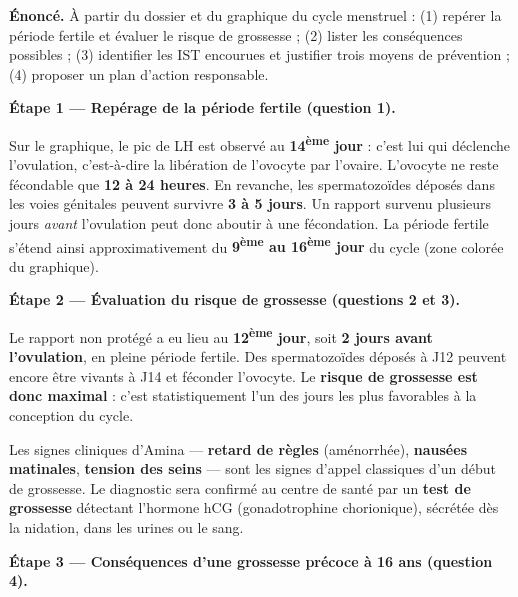\documentclass[11pt]{article}
\newcommand{\cle}[1]{{\popxbold\color{popdark}#1}}
\begin{document}
\begin{exoresolu}
\textbf{Énoncé.} À partir du dossier et du graphique du cycle menstruel : (1) repérer la période fertile et évaluer le risque de grossesse ; (2) lister les conséquences possibles ; (3) identifier les IST encourues et justifier trois moyens de prévention ; (4) proposer un plan d'action responsable.

\tcblower

\textbf{Étape 1 — Repérage de la période fertile (question 1).}

Sur le graphique, le \cle{pic de LH} est observé au \textbf{14\textsuperscript{ème} jour} : c'est lui qui déclenche l'\cle{ovulation}, c'est-à-dire la libération de l'ovocyte par l'ovaire. L'ovocyte ne reste fécondable que \textbf{12 à 24 heures}. En revanche, les spermatozoïdes déposés dans les voies génitales peuvent survivre \textbf{3 à 5 jours}. Un rapport survenu plusieurs jours \emph{avant} l'ovulation peut donc aboutir à une fécondation. La période fertile s'étend ainsi approximativement du \textbf{9\textsuperscript{ème} au 16\textsuperscript{ème} jour} du cycle (zone colorée du graphique).

\textbf{Étape 2 — Évaluation du risque de grossesse (questions 2 et 3).}

Le rapport non protégé a eu lieu au \textbf{12\textsuperscript{ème} jour}, soit \textbf{2 jours avant l'ovulation}, en pleine période fertile. Des spermatozoïdes déposés à J12 peuvent encore être vivants à J14 et féconder l'ovocyte. Le \textbf{risque de grossesse est donc maximal} : c'est statistiquement l'un des jours les plus favorables à la conception du cycle.

Les signes cliniques d'Amina — \textbf{retard de règles} (aménorrhée), \textbf{nausées matinales}, \textbf{tension des seins} — sont les signes d'appel classiques d'un début de grossesse. Le diagnostic sera confirmé au centre de santé par un \textbf{test de grossesse} détectant l'hormone \cle{hCG} (gonadotrophine chorionique), sécrétée dès la nidation, dans les urines ou le sang.

\textbf{Étape 3 — Conséquences d'une grossesse précoce à 16 ans (question 4).}


\end{exoresolu}
\end{document}
